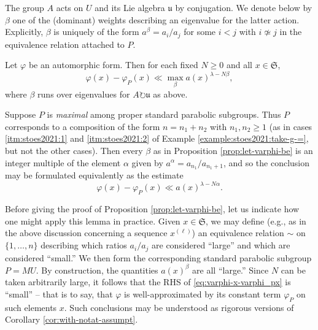 \documentclass[reqno]{amsart} 
\begin{document}
The group $A$ acts on $U$ and its Lie algebra $\mathfrak{u}$ by conjugation.  We denote below by $\beta$ one of the (dominant) weights describing an eigenvalue for the latter action.  Explicitly, $\beta$ is uniquely of the form $a^\beta = a_i / a_j$ for some $i < j$ with $i \not \simeq j$ in the equivalence relation attached to $P$.

\begin{proposition}\label{prop:let-varphi-be}
  Let $\varphi$ be an automorphic form.  Then for each fixed $N \geq 0$ and all $x \in \mathfrak{S}$,
  \begin{equation}\label{eq:varphi-x-varphi_px}
    \varphi (x) - \varphi_P(x) \ll \max _{\beta } a(x)^{\lambda - N \beta },
  \end{equation}
  where $\beta$ runs over eigenvalues for $A \circlearrowright \mathfrak{u}$ as above.
\end{proposition}

\begin{example}
  Suppose $P$ is \emph{maximal} among proper standard parabolic subgroups.  Thus $P$ corresponds to a composition of the form $n = n_1 + n_2$ with $n_1, n_2 \geq 1$ (as in cases \eqref{itm:stoes2021:1} and \eqref{itm:stoes2021:2} of Example \ref{example:stoes2021:take-g-=}, but not the other cases).  Then every $\beta$ as in Proposition \ref{prop:let-varphi-be} is an integer multiple of the element $\alpha$ given by $a^{\alpha} = a_{n_1} / a_{n_1+1}$, and so the conclusion may be formulated equivalently as the estimate
  \begin{equation}\label{eq:varphi-x-varphi_px-maximal}
    \varphi (x) - \varphi_P(x) \ll a(x)^{\lambda - N \alpha }.
  \end{equation}
\end{example}

Before giving the proof of Proposition \ref{prop:let-varphi-be}, let us indicate how one might apply this lemma in practice.  Given $x \in \mathfrak{S}$, we may define (e.g., as in the above discussion concerning a sequence $x^{(\ell)}$) an equivalence relation $\sim$ on $\{1, \dotsc, n\}$ describing which ratios $a_i/a_j$ are considered ``large'' and which are considered ``small.''  We then form the corresponding standard parabolic subgroup $P = M U$.  By construction, the quantities $a(x)^{\beta}$ are all ``large.''  Since $N$ can be taken arbitrarily large, it follows that the RHS of \eqref{eq:varphi-x-varphi_px} is ``small'' -- that is to say, that $\varphi$ is well-approximated by its constant term $\varphi_P$ on such elements $x$.  Such conclusions may be understood as rigorous versions of Corollary \ref{cor:with-notat-assumpt}.
\end{document}
